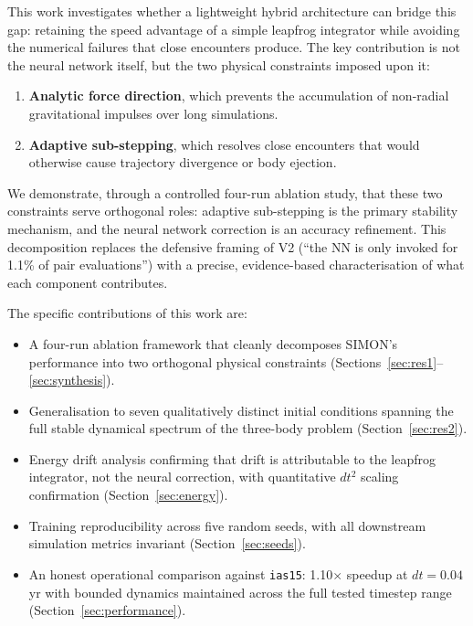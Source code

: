 \documentclass[12pt]{article}
\begin{document}
This work investigates whether a lightweight hybrid architecture can bridge this gap:
retaining the speed advantage of a simple leapfrog integrator while avoiding the numerical
failures that close encounters produce. The key contribution is not the neural network
itself, but the two physical constraints imposed upon it:
\begin{enumerate}
  \item \textbf{Analytic force direction}, which prevents the accumulation of non-radial
        gravitational impulses over long simulations.
  \item \textbf{Adaptive sub-stepping}, which resolves close encounters that would otherwise
        cause trajectory divergence or body ejection.
\end{enumerate}

We demonstrate, through a controlled four-run ablation study, that these two constraints
serve orthogonal roles: adaptive sub-stepping is the primary stability mechanism, and the
neural network correction is an accuracy refinement. This decomposition replaces the
defensive framing of V2 (``the NN is only invoked for 1.1\% of pair evaluations'') with
a precise, evidence-based characterisation of what each component contributes.

The specific contributions of this work are:
\begin{itemize}
  \item A four-run ablation framework that cleanly decomposes SIMON's performance into
        two orthogonal physical constraints (Sections~\ref{sec:res1}--\ref{sec:synthesis}).
  \item Generalisation to seven qualitatively distinct initial conditions spanning the
        full stable dynamical spectrum of the three-body problem (Section~\ref{sec:res2}).
  \item Energy drift analysis confirming that drift is attributable to the leapfrog integrator,
        not the neural correction, with quantitative $dt^2$ scaling confirmation
        (Section~\ref{sec:energy}).
  \item Training reproducibility across five random seeds, with all downstream simulation
        metrics invariant (Section~\ref{sec:seeds}).
  \item An honest operational comparison against \texttt{ias15}: 1.10$\times$ speedup at
        $dt = 0.04$\,yr with bounded dynamics maintained across the full tested timestep range
        (Section~\ref{sec:performance}).
\end{itemize}
\end{document}
